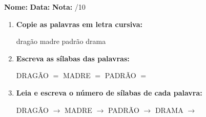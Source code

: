 \begin{exercicio}



\noindent\textbf{Nome:} \underline{\hspace{3.2cm}} \quad \textbf{Data:} \underline{\hspace{1.6cm}} \quad \textbf{Nota:} \underline{\hspace{0.9cm}}/10


\begin{enumerate}

  \item \textbf{Copie as palavras em letra cursiva:}
  \begin{center}
  dragão \quad madre \quad padrão \quad drama
  \end{center}
  \begin{center}
  \underline{\hspace{2.4cm}} \quad \underline{\hspace{2.4cm}} \quad \underline{\hspace{2.4cm}} \quad \underline{\hspace{2.4cm}}
  \end{center}

  \item \textbf{Escreva as sílabas das palavras:}
  \begin{center}
  DRAGÃO $=$ \underline{\hspace{1.5cm}} \underline{\hspace{1.5cm}} \quad MADRE $=$ \underline{\hspace{1.5cm}} \underline{\hspace{1.5cm}} \quad PADRÃO $=$ \underline{\hspace{1.5cm}} \underline{\hspace{1.5cm}}
  \end{center}

  \item \textbf{Leia e escreva o número de sílabas de cada palavra:}
  \begin{center}
  DRAGÃO $\rightarrow$ \underline{\hspace{0.9cm}} \quad MADRE $\rightarrow$ \underline{\hspace{0.9cm}} \quad PADRÃO $\rightarrow$ \underline{\hspace{0.9cm}} \quad DRAMA $\rightarrow$ \underline{\hspace{0.9cm}}
  \end{center}


\end{enumerate}
\end{exercicio}
